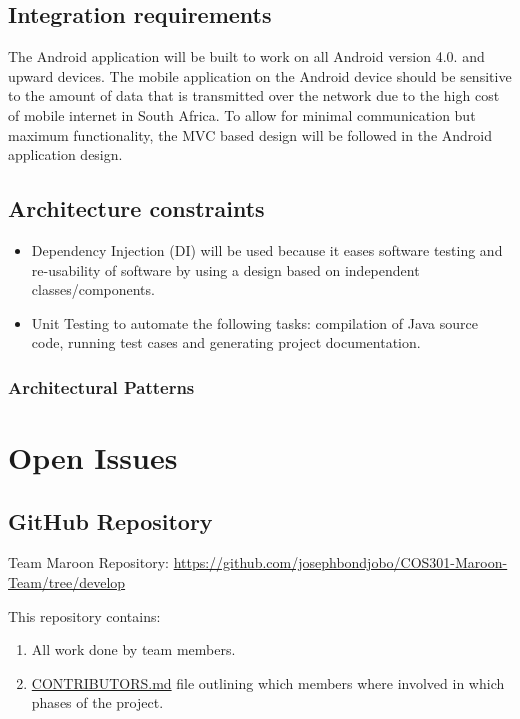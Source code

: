 \documentclass[a4paper,10pt]{article}
\begin{document}
\subsection{Integration requirements}
The Android application will be built to work on all Android version 4.0.  and upward devices. The mobile application on the Android device should be sensitive to the amount of data that is transmitted over the network due to the high cost of mobile internet in South Africa. To allow for minimal communication but maximum functionality, the MVC based design will be followed in the Android application design. 
\subsection{Architecture constraints}
\begin{itemize}
\item Dependency Injection (DI) will be used because it eases software testing and re-usability of software by using a design based on independent classes/components.
\item Unit Testing to automate the following tasks: compilation of Java source code, running test cases and generating project documentation.
\end{itemize}
\subsubsection{Architectural Patterns}

\clearpage
\section{Open Issues}
\subsection {GitHub Repository}
Team Maroon Repository: \url{https://github.com/josephbondjobo/COS301-Maroon-Team/tree/develop}

This repository contains:
\begin{enumerate}
\item All work done by team members.
\item \href{https://github.com/josephbondjobo/COS301-Maroon-Team/blob/develop/Intro/Contributors.md}{CONTRIBUTORS.md} file outlining which members where involved in which phases of the project.
\end{enumerate}



\newpage
\clearpage
{}
\end{document}

